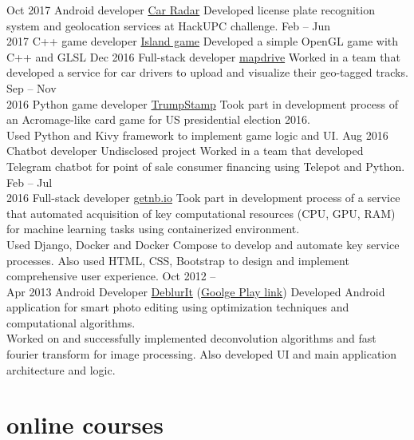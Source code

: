 \documentclass[]{friggeri-cv}
\begin{document}
\begin{entrylist}
	\entry
		{Oct 2017}
		{Android developer}
		{\href{https://devpost.com/software/hackupc2017f-rk3z5m}{Car Radar}}
		{Developed license plate recognition system and geolocation services at HackUPC challenge.}
	\entry
		{Feb -- Jun \\ 2017}
		{C++ game developer}
		{\href{https://bitbucket.org/standy66/studenttasks2017/src/cbc48cb2287b24df5fb5ed61c05ef77e5436ef01/task3/394Stepanov/}{Island game}}
		{Developed a simple OpenGL game with C++ and GLSL}
	\entry
		{Dec 2016}
		{Full-stack developer}
		{\href{https://github.com/GreenRiverRUS/map_drive}{mapdrive}}
		{Worked in a team that developed a service for car drivers to upload and visualize their geo-tagged tracks.}
	\entry
		{Sep -- Nov \\ 2016}
		{Python game developer}
		{\href{https://play.google.com/store/apps/details?id=org.trumpstamp.trumpstamp}{TrumpStamp}}
		{Took part in development process of an Acromage-like card game for US presidential election 2016. \\
		Used Python and Kivy framework to implement game logic and UI.}
	\entry
		{Aug 2016}
		{Chatbot developer}
		{Undisclosed project}
		{Worked in a team that developed Telegram chatbot for point of sale consumer financing using Telepot and Python.}
	\entry
		{Feb -- Jul \\ 2016}
		{Full-stack developer}
		{\href{https://gitlab.com/getnb/}{getnb.io}}
		{Took part in development process of a service that automated acquisition of key computational resources (CPU, GPU, RAM) for machine learning tasks using containerized environment. \\
		Used Django, Docker and Docker Compose to develop and automate key service processes. Also used HTML, CSS, Bootstrap to design and implement comprehensive user experience.}
	\entry
		{Oct 2012 -- \\ Apr 2013}
		{Android Developer}
		{\href{https://github.com/standy66/deblurit}{DeblurIt} (\href{https://play.google.com/store/apps/details?id=tk.standy66.deblurit}{Goolge Play link})}
		{Developed Android application for smart photo editing using optimization techniques and computational algorithms. \\
		Worked on and successfully implemented deconvolution algorithms and fast fourier transform for image processing. Also developed UI and main application architecture and logic.}
\end{entrylist}

\section{online courses}
\end{document}
